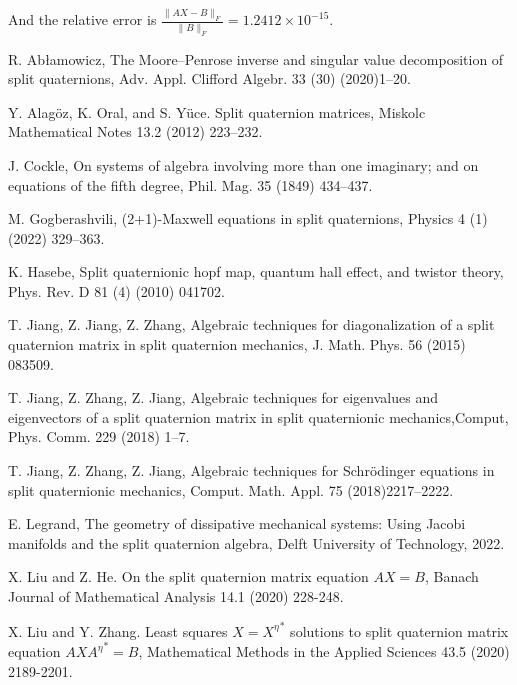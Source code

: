\documentclass[3p]{elsarticle}
\numberwithin{equation}{section}
\begin{document}
And the relative error is $\frac{\|AX - B\|_F}{\|B\|_F} = 1.2412\times 10^{-15}$.
\fi
\begin{thebibliography}{99}

 R. Abłamowicz, The Moore–Penrose inverse and singular value decomposition of split quaternions, Adv. Appl. Clifford Algebr. 33 (30) (2020)1–20.

 Y. Alag\"oz, K. Oral, and S. Y\"uce. Split quaternion matrices, Miskolc Mathematical Notes 13.2 (2012) 223–232.

 J. Cockle, On systems of algebra involving more than one imaginary; and on equations of the fifth degree, Phil. Mag. 35 (1849) 434–437.

 M. Gogberashvili, (2+1)-Maxwell equations in split quaternions, Physics 4 (1) (2022) 329–363.

 K. Hasebe, Split quaternionic hopf map, quantum hall effect, and twistor theory, Phys. Rev. D 81 (4) (2010) 041702.

 T. Jiang, Z. Jiang, Z. Zhang, Algebraic techniques for diagonalization of a split quaternion matrix in split quaternion mechanics, J. Math. Phys. 56 (2015) 083509.

T. Jiang, Z. Zhang, Z. Jiang, Algebraic techniques for eigenvalues and eigenvectors of a split quaternion matrix in split quaternionic mechanics,Comput, Phys. Comm. 229 (2018) 1–7.

T. Jiang, Z. Zhang, Z. Jiang, Algebraic techniques for Schrödinger equations in split quaternionic mechanics, Comput. Math. Appl. 75 (2018)2217–2222.

 E. Legrand, The geometry of dissipative mechanical systems: Using Jacobi manifolds and the split quaternion algebra, Delft University of
Technology, 2022.

 X. Liu and Z. He. On the split quaternion matrix equation $AX= B$, Banach Journal of Mathematical Analysis 14.1 (2020) 228-248.

 X. Liu and Y. Zhang. Least squares \(X = {X^{\eta}}^* \) solutions to split quaternion matrix equation \(AX{A^{\eta}}^*= B\), Mathematical Methods in the Applied Sciences 43.5 (2020) 2189-2201.


\end{thebibliography}
\end{document}
